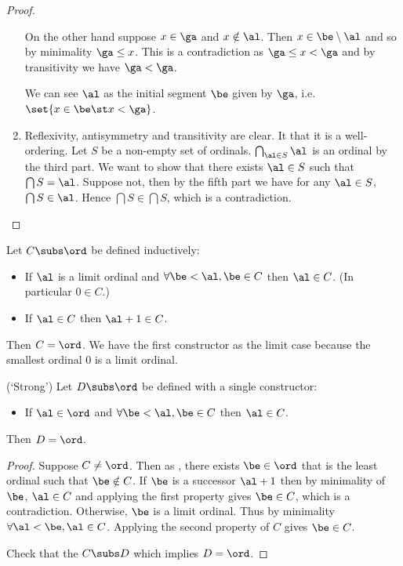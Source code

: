 \begin{proof}
\begin{enumerate}
            On the other hand suppose $x \in \ga$ and $x \notin \al$.
            Then $x \in \be \setminus \al$ and so by minimality $\ga \leq x$.
            This is a contradiction as $\ga \leq x < \ga$ and by transitivity
            we have $\ga < \ga$.

            We can see $\al$ as the initial segment $\be$ given by $\ga$, 
            i.e. $\set{x \in \be \st x < \ga}$.
        \item Reflexivity, antisymmetry and transitivity are clear.
            It  
            that it is a well-ordering.
            Let $S$ be a non-empty set of ordinals.
            $\bigcap_{\al \in S} \al$ is an ordinal by the third part.
            We want to show that there exists $\al \in S$ such that 
            $\bigcap S = \al$.
            Suppose not, then by the fifth part we have for any $\al \in S$,
            $\bigcap S \in \al$.
            Hence $\bigcap S \in \bigcap S$, which is a contradiction.
    \end{enumerate}
\end{proof}

\begin{prop}
    Let $C \subs \ord$ be defined inductively:
    \begin{itemize}
        \item If $\al$ is a limit ordinal and $\forall \be < \al, \be \in C$
        then $\al \in C$. (In particular $0 \in C$.)
        \item If $\al \in C$ then $\al + 1 \in C$.
    \end{itemize}
    Then $C = \ord$. 
    We have the first constructor as the limit case because 
    the smallest ordinal $0$ is a limit ordinal.

    (`Strong') Let $D \subs \ord$ be defined with a single constructor:
    \begin{itemize}
        \item If $\al \in \ord$ and $\forall \be < \al, \be \in C$
        then $\al \in C$.
    \end{itemize}
    Then $D = \ord$.
\end{prop}
\begin{proof}
    Suppose $C \ne \ord$.
    Then as ,
    there exists $\be \in \ord$ that is the least ordinal such that 
    $\be \notin C$.
    If $\be$ is a successor $\al + 1$ then by minimality of $\be$, $\al \in C$ 
    and applying the first property gives $\be \in C$,
    which is a contradiction. 
    Otherwise, $\be$ is a limit ordinal. 
    Thus by minimality
    $\forall \al < \be, \al \in C$.
    Applying the second property of $C$ gives $\be \in C$.

    Check that the $C \subs D$ which implies $D = \ord$.
\end{proof}

